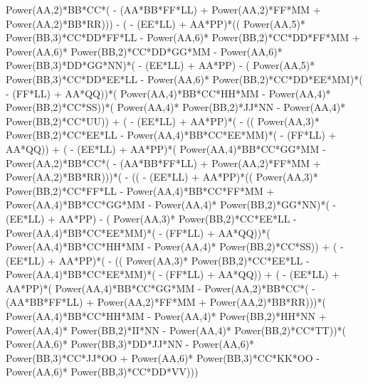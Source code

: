 \documentclass[10pt]{article} %
\begin{document}
{Power(AA,2)*BB*CC*( - (AA*BB*FF*LL) +  Power(AA,2)*FF*MM +  Power(AA,2)*BB*RR))) - ( - (EE*LL) + AA*PP)*(( Power(AA,5)* Power(BB,3)*CC*DD*FF*LL -  Power(AA,6)* Power(BB,2)*CC*DD*FF*MM +  Power(AA,6)* Power(BB,2)*CC*DD*GG*MM -  Power(AA,6)* Power(BB,3)*DD*GG*NN)*( - (EE*LL) + AA*PP) - ( Power(AA,5)* Power(BB,3)*CC*DD*EE*LL -  Power(AA,6)* Power(BB,2)*CC*DD*EE*MM)*( - (FF*LL) + AA*QQ))*( Power(AA,4)*BB*CC*HH*MM -  Power(AA,4)* Power(BB,2)*CC*SS))*( Power(AA,4)* Power(BB,2)*JJ*NN -  Power(AA,4)* Power(BB,2)*CC*UU)) + ( - (EE*LL) + AA*PP)*( - (( Power(AA,3)* Power(BB,2)*CC*EE*LL -  Power(AA,4)*BB*CC*EE*MM)*( - (FF*LL) + AA*QQ)) + ( - (EE*LL) + AA*PP)*( Power(AA,4)*BB*CC*GG*MM -  Power(AA,2)*BB*CC*( - (AA*BB*FF*LL) +  Power(AA,2)*FF*MM +  Power(AA,2)*BB*RR)))*( - (( - (EE*LL) + AA*PP)*(( Power(AA,3)* Power(BB,2)*CC*FF*LL -  Power(AA,4)*BB*CC*FF*MM +  Power(AA,4)*BB*CC*GG*MM -  Power(AA,4)* Power(BB,2)*GG*NN)*( - (EE*LL) + AA*PP) - ( Power(AA,3)* Power(BB,2)*CC*EE*LL -  Power(AA,4)*BB*CC*EE*MM)*( - (FF*LL) + AA*QQ))*( Power(AA,4)*BB*CC*HH*MM -  Power(AA,4)* Power(BB,2)*CC*SS)) + ( - (EE*LL) + AA*PP)*( - (( Power(AA,3)* Power(BB,2)*CC*EE*LL -  Power(AA,4)*BB*CC*EE*MM)*( - (FF*LL) + AA*QQ)) + ( - (EE*LL) + AA*PP)*( Power(AA,4)*BB*CC*GG*MM -  Power(AA,2)*BB*CC*( - (AA*BB*FF*LL) +  Power(AA,2)*FF*MM +  Power(AA,2)*BB*RR)))*( Power(AA,4)*BB*CC*HH*MM -  Power(AA,4)* Power(BB,2)*HH*NN +  Power(AA,4)* Power(BB,2)*II*NN -  Power(AA,4)* Power(BB,2)*CC*TT))*( Power(AA,6)* Power(BB,3)*DD*JJ*NN -  Power(AA,6)* Power(BB,3)*CC*JJ*OO +  Power(AA,6)* Power(BB,3)*CC*KK*OO -  Power(AA,6)* Power(BB,3)*CC*DD*VV)))
} \break
\end{document}
